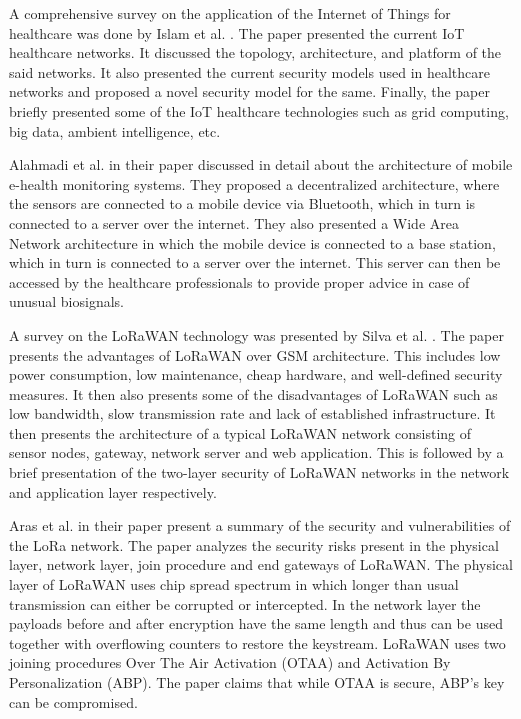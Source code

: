 \documentclass[conference]{IEEEtran}
\begin{document}
 A comprehensive survey on the application of the Internet of Things for healthcare was done by Islam et al. \cite{islam2015internet}. The paper presented the current IoT healthcare networks. It discussed the topology, architecture, and platform of the said networks. It also presented the current security models used in healthcare networks and proposed a novel security model for the same. Finally, the paper briefly presented some of the IoT healthcare technologies such as grid computing, big data, ambient intelligence, etc.
 
 Alahmadi et al. \cite{alahmadi2011smart} in their paper discussed in detail about the architecture of mobile e-health monitoring systems. They proposed a decentralized architecture, where the sensors are connected to a mobile device via Bluetooth, which in turn is connected to a server over the internet. They also presented a Wide Area Network architecture in which the mobile device is connected to a base station, which in turn is connected to a server over the internet. This server can then be accessed by the healthcare professionals to provide proper advice in case of unusual biosignals.
 
 A survey on the LoRaWAN technology was presented by Silva et al. \cite{de2017lorawan}. The paper presents the advantages of LoRaWAN over GSM architecture. This includes low power consumption, low maintenance, cheap hardware, and well-defined security measures. It then also presents some of the disadvantages of LoRaWAN such as low bandwidth, slow transmission rate and lack of established infrastructure. It then presents the architecture of a typical LoRaWAN network consisting of sensor nodes, gateway, network server and web application. 
 This is followed by a brief presentation of the two-layer security of LoRaWAN networks in the network and application layer respectively.
 
 Aras et al. \cite{aras2017exploring} in their paper present a summary of the security and vulnerabilities of the LoRa network. The paper analyzes the security risks present in the physical layer, network layer, join procedure and end gateways of LoRaWAN. The physical layer of LoRaWAN uses chip spread spectrum in which longer than usual transmission can either be corrupted or intercepted. In the network layer the payloads before and after encryption have the same length and thus can be used together with overflowing counters to restore the keystream. LoRaWAN uses two joining procedures Over The Air Activation (OTAA) and Activation By Personalization (ABP). The paper claims that while OTAA is secure, ABP's key can be compromised.
 
\end{document}
